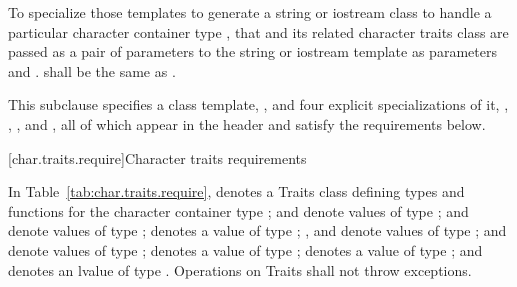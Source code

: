 \pnum
To specialize those templates to generate a string or
iostream class to handle a particular character container type
,
that and its related character traits class
are passed as a pair of parameters to the string or iostream template as
parameters
and
.
shall be the same as
.

\pnum
This subclause specifies a class template,
,
and four explicit specializations of it,
,
,
,
and
,
all of which appear in the header
and satisfy the requirements below.

[char.traits.require]{Character traits requirements}

\pnum
In Table~\ref{tab:char.traits.require},
denotes a Traits class defining types and functions for the
character container type
;
and
denote values of type
;
and
denote values of type
;
denotes a value of type
;
,
and
denote values of type
;
and
denote values of type
;
denotes a value of type
;
denotes a value of type
;
and
denotes an lvalue of type
.
Operations on Traits shall not throw exceptions.

